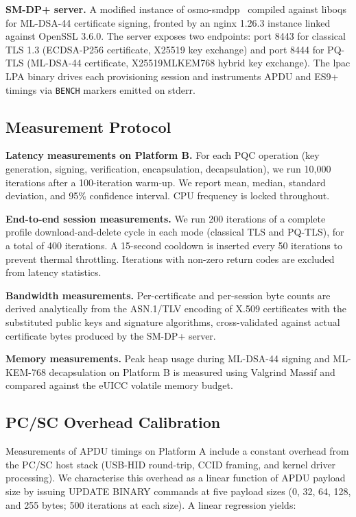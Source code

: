 \documentclass[a4paper,fleqn]{cas-sc}
\begin{document}
\textbf{SM-DP+ server.} A modified instance of osmo-smdpp~\cite{osmo_smdpp}
compiled against liboqs for ML-DSA-44 certificate signing, fronted by
an nginx 1.26.3 instance linked against OpenSSL 3.6.0. The server
exposes two endpoints: port 8443 for classical TLS 1.3 (ECDSA-P256
certificate, X25519 key exchange) and port 8444 for PQ-TLS
(ML-DSA-44 certificate, X25519MLKEM768 hybrid key exchange). The lpac
LPA binary drives each provisioning session and instruments APDU and
ES9+ timings via \texttt{BENCH} markers emitted on stderr.

\subsection{Measurement Protocol}
\label{sec:bench-metrics}

\textbf{Latency measurements on Platform B.} For each PQC operation
(key generation, signing, verification, encapsulation, decapsulation),
we run 10,000 iterations after a 100-iteration warm-up. We report
mean, median, standard deviation, and 95\% confidence interval.
CPU frequency is locked throughout.

\textbf{End-to-end session measurements.} We run 200 iterations of a
complete profile download-and-delete cycle in each mode (classical
TLS and PQ-TLS), for a total of 400 iterations. A 15-second cooldown
is inserted every 50 iterations to prevent thermal throttling.
Iterations with non-zero return codes are excluded from latency
statistics.

\textbf{Bandwidth measurements.} Per-certificate and per-session
byte counts are derived analytically from the ASN.1/TLV encoding
of X.509 certificates with the substituted public keys and signature
algorithms, cross-validated against actual certificate bytes produced
by the SM-DP+ server.

\textbf{Memory measurements.} Peak heap usage during ML-DSA-44 signing
and ML-KEM-768 decapsulation on Platform B is measured using Valgrind
Massif and compared against the eUICC volatile memory budget.

\subsection{PC/SC Overhead Calibration}
\label{sec:bench-cal}

Measurements of APDU timings on Platform A include a constant overhead
from the PC/SC host stack (USB-HID round-trip, CCID framing, and kernel
driver processing). We characterise this overhead as a linear function
of APDU payload size by issuing UPDATE BINARY commands at five payload
sizes (0, 32, 64, 128, and 255 bytes; 500 iterations at each size). A
linear regression yields:
\end{document}
